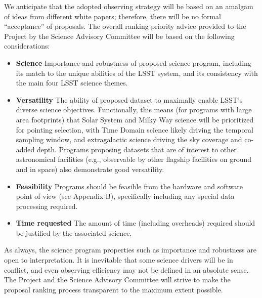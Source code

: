 \documentclass[DM,lsstdraft,toc,usenatbib]{lsstdoc}
\begin{document}
We anticipate that the adopted observing strategy will be based on an amalgam of ideas from 
different white papers; therefore, there will be no formal ``acceptance'' of proposals. The
overall ranking priority advice provided to the Project by the Science Advisory Committee 
will be based on the following considerations: 
\begin{itemize}
\item {\bf Science} Importance and robustness of proposed science program, including 
           its match to the unique abilities of the LSST system, and its consistency with the 
           main four LSST science themes. 
\item {\bf Versatility} The ability of proposed dataset to maximally enable LSST's diverse science objectives. 
          Functionally, this means (for programs with large area footprints) that Solar System and Milky Way science will be prioritized for pointing selection,
          with Time Domain science likely driving the temporal sampling window, and extragalactic science driving 
          the sky coverage and co-added depth. Programs proposing datasets that are of interest to other astronomical 
          facilities (e.g., observable by other flagship facilities on ground and in space) also demonstrate good versatility.
\item {\bf Feasibility} Programs should be feasible from the hardware and software point of view (see Appendix B),
         specifically including any special data processing required.
\item {\bf Time requested} The amount of time (including overheads) required should be justified by 
        the associated science. 
\end{itemize} 

As always, the science program properties such as importance and robustness are open
to interpretation. It is inevitable that some science drivers will be in conflict, and even
observing efficiency may not be defined in an absolute sense. The Project and the Science Advisory 
Committee will strive to make the proposal ranking process transparent to the maximum extent possible. 
\end{document}
